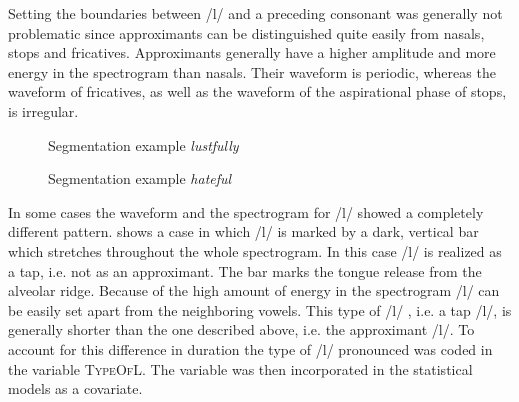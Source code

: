 Setting the boundaries between /l/ and a preceding consonant was generally not problematic since approximants can be distinguished quite easily from nasals, stops and fricatives. Approximants generally have a  higher amplitude and more energy in the spectrogram than nasals. Their waveform is periodic, whereas the waveform of fricatives, as well as the waveform of the aspirational phase of stops, is irregular.



\begin{figure}[p]
	\caption{Segmentation example \textit{lustfully}}
	\label{fig:segmentation lustfully}
\end{figure}

\begin{figure}[p]
	\caption{Segmentation example \textit{hateful}}
	\label{fig:segmentation hateful}
\end{figure}



In some cases the waveform and the spectrogram for /l/ showed a completely different pattern.  shows a case in which /l/ is marked by a dark, vertical bar which stretches throughout the whole spectrogram. In this case /l/ is realized as a tap, i.e. not as an approximant. The bar marks the tongue release from the alveolar ridge. Because of the high amount of energy in the spectrogram /l/ can be easily set apart  from the neighboring vowels. This type of /l/ , i.e. a tap /l/, is generally shorter than the one described above, i.e. the approximant /l/. To account for this difference in duration the type of /l/ pronounced was coded in the variable \textsc{TypeOfL}. The variable was then incorporated in the statistical models as a covariate.

